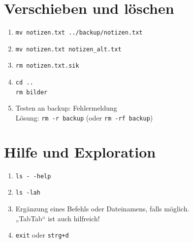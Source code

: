 \documentclass[a4paper,11pt]{article}
\newcommand{\cmd}[1]{\texttt{#1}}
\begin{document}
\section{Verschieben und löschen}
\begin{enumerate}[label=\arabic*.]
  \item \cmd {mv notizen.txt ../backup/notizen.txt}
  \item \cmd {mv notizen.txt notizen\_alt.txt}
  \item \cmd {rm notizen.txt.sik}
  \item \cmd {cd ..} \\
  \cmd {rm bilder}
  \item Testen an backup: Fehlermeldung\\
  Lösung: \cmd {rm -r backup} (oder \cmd {rm -rf backup})
\end{enumerate}


\section{Hilfe und Exploration}

\begin{enumerate}[label=\arabic*.]
  \item \cmd {ls -\,-help}
  \item \cmd {ls -lah}
  \item Ergänzung eines Befehls oder Dateinamens, falls möglich.\\
  „TabTab“ ist auch hilfreich!
  \item \cmd {exit} oder \cmd {strg+d}
\end{enumerate}
\end{document}
